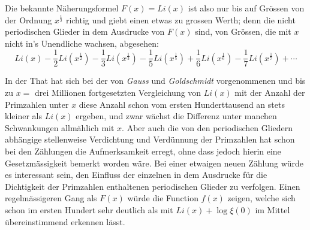 \documentclass[a4paper,12pt]{article}
\begin{document}
Die bekannte N\"{a}herungsformel $F(x) = {Li}(x)$ ist also nur bis auf
Gr\"{o}ssen von der Ordnung $x^{\frac{1}{2}}$ richtig und giebt einen
etwas zu grossen Werth; denn die nicht periodischen Glieder in dem
Ausdrucke von $F(x)$ sind, von Gr\"{o}ssen, die mit $x$ nicht in's
Unendliche wachsen, abgesehen:
\[ {Li}(x) - {\textstyle\frac{1}{2}}{Li}(x^{\frac{1}{2}})
           - {\textstyle\frac{1}{3}}{Li}(x^{\frac{1}{3}})
           - {\textstyle\frac{1}{5}}{Li}(x^{\frac{1}{5}})
           + {\textstyle\frac{1}{6}}{Li}(x^{\frac{1}{6}})
           - {\textstyle\frac{1}{7}}{Li}(x^{\frac{1}{7}})
           + \cdots \]

In der That hat sich bei der von \emph{Gauss} und
\emph{Goldschmidt} vorgenommenen und bis zu $x = $ drei Millionen
fortgesetzten Vergleichung von ${Li}(x)$ mit der Anzahl der Primzahlen
unter $x$ diese Anzahl schon vom ersten Hunderttausend an stets
kleiner als ${Li}(x)$ ergeben, und zwar w\"{a}chst die Differenz unter
manchen Schwankungen allm\"{a}hlich mit $x$.  Aber auch die von den
periodischen Gliedern abh\"{a}ngige stellenweise Verdichtung und
Verd\"{u}nnung der Primzahlen hat schon bei den Z\"{a}hlungen die
Aufmerksamkeit erregt, ohne dass jedoch hierin eine
Gesetzm\"{a}ssigkeit bemerkt worden w\"{a}re.  Bei einer etwaigen
neuen Z\"{a}hlung w\"{u}rde es interessant sein, den Einfluss der
einzelnen in dem Ausdrucke f\"{u}r die Dichtigkeit der Primzahlen
enthaltenen periodischen Glieder zu verfolgen.  Einen
regelm\"{a}ssigeren Gang als $F(x)$ w\"{u}rde die Function $f(x)$
zeigen, welche sich schon im ersten Hundert sehr deutlich als mit
${Li}(x) + \log \xi(0)$ im Mittel \"{u}bereinstimmend erkennen
l\"{a}sst.
\end{document}
